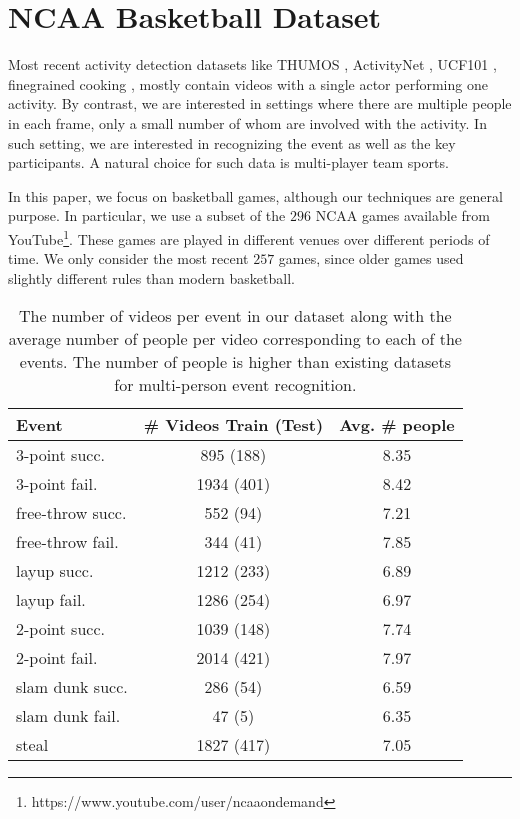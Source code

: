 
\section{NCAA Basketball Dataset}

Most recent activity detection datasets like THUMOS \cite{THUMOS},
ActivityNet \cite{ActivityNet}, UCF101 
\cite{UCF101}, finegrained cooking \cite{Finegrained_cooking},
mostly contain videos with a single actor performing one activity.
By contrast, we are interested in settings where there are multiple
people in each frame, only a small number of whom are involved with
the  activity. In such setting, we are interested in recognizing the event
as well as the key participants. A natural choice for such data is
multi-player team sports.

In this paper, we focus on basketball games, although our techniques
are general purpose.
In particular,  we use a subset of the $296$ NCAA games available from 
YouTube\footnote{https://www.youtube.com/user/ncaaondemand}.  These games are
played in different venues over different periods of time.
We only consider the most recent $257$ games, since older games used
slightly different rules than modern basketball.

\begin{table}[ht!]
\begin{center}
\small
 \begin{tabular}{|l|c|c|}
  \hline
  Event          & \# Videos Train (Test) & Avg. \# people \\ \hline \hline
  3-point succ.    & 895 (188) &  8.35 \\ 
  3-point fail.    & 1934 (401) &  8.42 \\ 
  free-throw succ. & 552 (94) &  7.21\\ 
  free-throw fail. & 344 (41) &  7.85\\  
  layup succ.      & 1212 (233) &  6.89\\ 
  layup fail.      & 1286 (254) &  6.97 \\ 
  2-point succ.    & 1039 (148) &  7.74 \\ 
  2-point fail.    & 2014 (421) &  7.97\\ 
  slam dunk succ.  & 286 (54) &  6.59 \\ 
  slam dunk fail.  & 47 (5) &  6.35\\ 
  steal & 1827 (417) & 7.05\\ \hline  
  \end{tabular}
\end{center}
  \caption{The number of videos per event in our dataset along with
  the average number of people per video corresponding to each of the
events. The number of people is higher than existing datasets for
multi-person event recognition.}
  \label{tab:data_dist}
\end{table}


